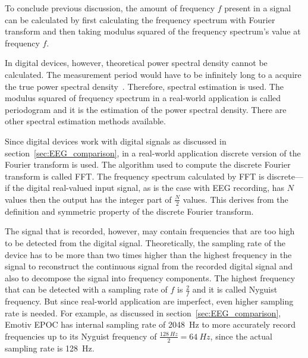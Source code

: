 To conclude previous discussion, the amount of frequency $f$ present in a signal can be calculated by first calculating the \gls{frequency spectrum} with \gls{Fourier transform} and then taking modulus squared of the \gls{frequency spectrum}'s value at frequency $f$.

In digital devices, however, theoretical \gls{power spectral density} cannot be calculated. The measurement period would have to be infinitely long to a acquire the true \gls{power spectral density}~\cite{psd}. Therefore, spectral estimation is used. The modulus squared of frequency spectrum in a real-world application is called \gls{periodogram} and it is the estimation of the \gls{power spectral density}. There are other spectral estimation methods available.

Since digital devices work with \glspl{digital signal} as discussed in section~\ref{sec:EEG_comparison}, in a real-world application discrete version of the \gls{Fourier transform} is used. The algorithm used to compute the discrete \gls{Fourier transform} is called \gls{FFT}. The \gls{frequency spectrum} calculated by \gls{FFT} is discrete---if the digital real-valued input signal, as is the case with \gls{EEG} recording, has $N$ values then the output has the integer part of $\frac{N}{2}$ values. This derives from the definition and symmetric property of the discrete \gls{Fourier transform}. %

The signal that is recorded, however, may contain frequencies that are too high to be detected from the \gls{digital signal}. Theoretically, the \gls{sampling rate} of the device has to be more than two times higher than the highest frequency in the signal to reconstruct the continuous signal from the recorded \gls{digital signal} and also to decompose the signal into \glspl{frequency component}. The highest frequency that can be detected with a \gls{sampling rate} of $f$ is $\frac{2}{f}$ and it is called \gls{Nyguist frequency}. But since real-world application are imperfect, even higher \gls{sampling rate} is needed. For example, as discussed in section~\ref{sec:EEG_comparison}, Emotiv EPOC has internal \gls{sampling rate} of \SI{2048}{Hz} to more accurately record frequencies up to its \gls{Nyguist frequency} of $\frac{\SI{128}{Hz}}{2}=\SI{64}{Hz}$, since the actual \gls{sampling rate} is \SI{128}{Hz}.

